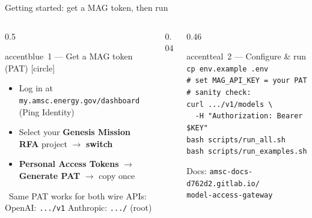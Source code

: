\begin{frame}{Getting started: get a MAG token, then run}
  \begin{columns}[t, totalwidth=\textwidth]
    \begin{column}{0.5\textwidth}
      \begin{featbox}{accentblue}{\faKey\ 1 --- Get a MAG token (PAT)}
        \small
        [circle]
        \begin{itemize}
          \item Log in at \texttt{my.amsc.energy.gov/dashboard} (Ping Identity)
          \item Select your \textbf{Genesis Mission RFA} project $\rightarrow$ \textbf{switch}
          \item \textbf{Personal Access Tokens} $\rightarrow$ \textbf{Generate PAT} $\rightarrow$ copy once
        \end{itemize}
      \end{featbox}
      \vspace{4pt}
      \begin{calloutbox}[labnavy]
        \scriptsize\faInfoCircle\ Same PAT works for both wire APIs:\\
        OpenAI: \texttt{.../v1} \quad\textbullet\quad Anthropic: \texttt{.../} (root)
      \end{calloutbox}
    \end{column}
    \begin{column}{0.04\textwidth}\end{column}
    \begin{column}{0.46\textwidth}
      \begin{featbox}{accentteal}{\faTerminal\ 2 --- Configure \& run}
        \scriptsize
        \texttt{cp env.example .env}\\
        \texttt{\# set MAG\_API\_KEY = your PAT}\\[3pt]
        \texttt{\# sanity check:}\\
        \texttt{curl .../v1/models \textbackslash}\\
        \texttt{~~-H "Authorization: Bearer \$KEY"}\\[3pt]
        \texttt{bash scripts/run\_all.sh}\\
        \texttt{bash scripts/run\_examples.sh}
      \end{featbox}
      \vspace{4pt}
      \begin{center}
        {\scriptsize\color{midgray}Docs: \texttt{amsc-docs-d762d2.gitlab.io/}\\
        \texttt{model-access-gateway}}
      \end{center}
    \end{column}
  \end{columns}
\end{frame}

